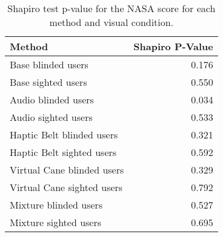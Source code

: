 
\begin{table}[!htb]
\centering
\caption{Shapiro test p-value for the NASA score for each method and visual condition.}
\label{tab:shapiro_nasa_score}
\begin{tabular}{lr}
\toprule
                    Method &  Shapiro P-Value \\
\midrule
        Base blinded users &            0.176 \\
        Base sighted users &            0.550 \\
       Audio blinded users &            0.034 \\
       Audio sighted users &            0.533 \\
 Haptic Belt blinded users &            0.321 \\
 Haptic Belt sighted users &            0.592 \\
Virtual Cane blinded users &            0.329 \\
Virtual Cane sighted users &            0.792 \\
     Mixture blinded users &            0.527 \\
     Mixture sighted users &            0.695 \\
\bottomrule
\end{tabular}
\end{table}


